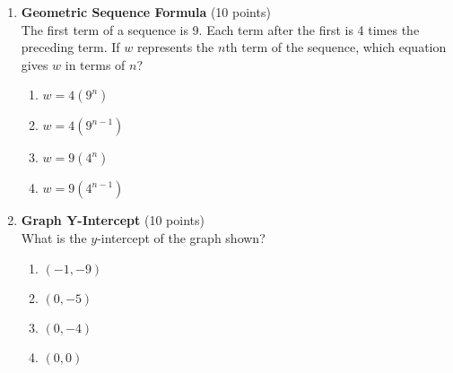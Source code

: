 \begin{enumerate}
  \item \textbf{Geometric Sequence Formula} (10 points)\\
  The first term of a sequence is 9. Each term after the first is 4 times the preceding term. If $w$ represents the $n$th term of the sequence, which equation gives $w$ in terms of $n$?
  \begin{enumerate}[label=(\Alph*)]
    \item $w=4\left(9^{n}\right)$
    \item $w=4\left(9^{n-1}\right)$
    \item $w=9\left(4^{n}\right)$
    \item $w=9\left(4^{n-1}\right)$
  \end{enumerate}
  \begin{subanswer}
  \end{subanswer}

  \newpage

  \item \textbf{Graph Y-Intercept} (10 points)\\
  What is the $y$-intercept of the graph shown?
  \begin{enumerate}[label=(\Alph*)]
    \item $(-1,-9)$
    \item $(0,-5)$
    \item $(0,-4)$
    \item $(0,0)$
  \end{enumerate}
  \begin{subanswer}
  \end{subanswer}

  \newpage


\end{enumerate}
